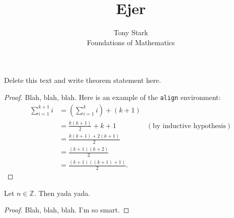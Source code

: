 \documentclass[12pt]{article}
\newcommand{\Z}{\mathbb{Z}}
\newenvironment{theorem}[2][Theorem]{\begin{trivlist}
\item[\hskip \labelsep {\bfseries #1}\hskip \labelsep {\bfseries #2.}]}{\end{trivlist}}
\begin{document}
\title{Ejer}%
\author{Tony Stark\\ %
Foundations of Mathematics} %
\maketitle
\begin{theorem}{x.yz} %
Delete this text and write theorem statement here.
\end{theorem}
\begin{proof}
Blah, blah, blah. Here is an example of the \texttt{align} environment:
\begin{align*}
\sum_{i=1}^{k+1}i & = \left(\sum_{i=1}^{k}i\right) +(k+1)\\
& = \frac{k(k+1)}{2}+k+1 & (\text{by inductive hypothesis})\\
& = \frac{k(k+1)+2(k+1)}{2}\\
& = \frac{(k+1)(k+2)}{2}\\
& = \frac{(k+1)((k+1)+1)}{2}.
\end{align*}
\end{proof}
\begin{theorem}{x.yz}
Let $n\in \Z$. Then yada yada.
\end{theorem}
\begin{proof}
Blah, blah, blah. I'm so smart.
\end{proof}
\end{document}
